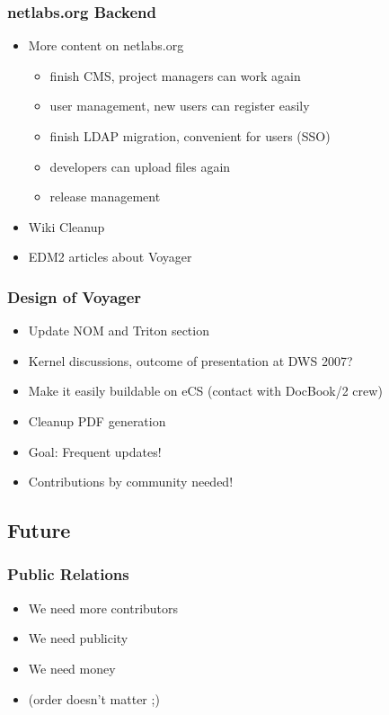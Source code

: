 \documentclass{beamer}
\begin{document}
\begin{frame}
\frametitle{netlabs.org Backend}
\begin{itemize}[<+->] 
  \item More content on netlabs.org
  \begin{itemize}[<+->]
    \item finish CMS, project managers can work again
    \item user management, new users can register easily
    \item finish LDAP migration, convenient for users (SSO)
    \item developers can upload files again
    \item release management
  \end{itemize}
  \item Wiki Cleanup
  \item EDM2 articles about Voyager
\end{itemize}
\end{frame}

\begin{frame}
\frametitle{Design of Voyager}
\begin{itemize}[<+->]
  \item Update NOM and Triton section
  \item Kernel discussions, outcome of presentation at DWS 2007?
  \item Make it easily buildable on eCS (contact with DocBook/2 crew)
  \item Cleanup PDF generation
  \item Goal: Frequent updates!
  \item Contributions by community needed!
\end{itemize}
\end{frame}

\subsection{Future}
\begin{frame}
\frametitle{Public Relations}
\begin{itemize}[<+->]
  \item We need more contributors
  \item We need publicity
  \item We need money
  \item (order doesn't matter ;)
\end{itemize}
\end{frame}
\end{document}
